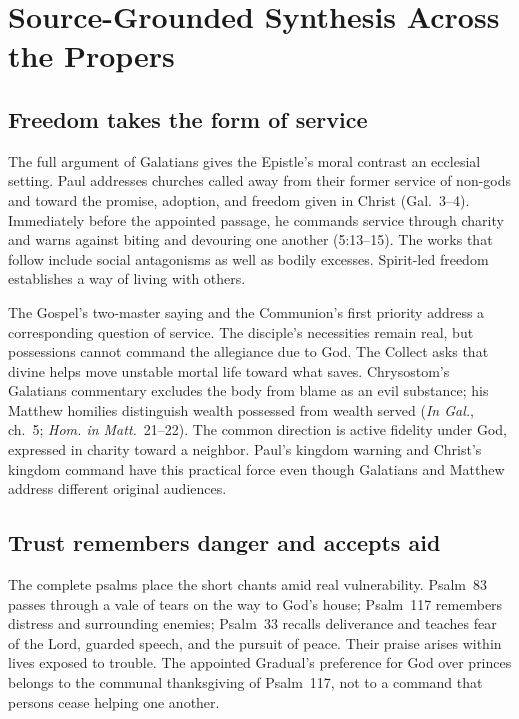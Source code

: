 \sectionguard
\section*{Source-Grounded Synthesis Across the Propers}

\subsection*{Freedom takes the form of service\enspace{}}

The full argument of Galatians gives the Epistle's moral contrast an ecclesial
setting. Paul addresses churches called away from their former service of
non-gods and toward the promise, adoption, and freedom given in Christ
(Gal.~3--4). Immediately before the appointed passage, he commands service
through charity and warns against biting and devouring one another
(5:13--15). The works that follow include social antagonisms as well as bodily
excesses. Spirit-led freedom establishes a way of living with others.

The Gospel's two-master saying and the Communion's first priority address a
corresponding question of service. The disciple's necessities remain real,
but possessions cannot command the allegiance due to God. The Collect asks
that divine helps move unstable mortal life toward what saves. Chrysostom's
Galatians commentary excludes the body from blame as an evil substance;
his Matthew homilies distinguish wealth possessed from wealth served
(\emph{In Gal.}, ch.~5; \emph{Hom. in Matt.}~21--22). The common direction is
active fidelity under God, expressed in charity toward a neighbor. Paul's
kingdom warning and Christ's kingdom command have this practical force even
though Galatians and Matthew address different original audiences.

\subsection*{Trust remembers danger and accepts aid\enspace{}}

The complete psalms place the short chants amid real vulnerability. Psalm~83
passes through a vale of tears on the way to God's house; Psalm~117 remembers
distress and surrounding enemies; Psalm~33 recalls deliverance and teaches
fear of the Lord, guarded speech, and the pursuit of peace. Their praise
arises within lives exposed to trouble. The appointed Gradual's preference
for God over princes belongs to the communal thanksgiving of Psalm~117,
not to a command that persons cease helping one another.

